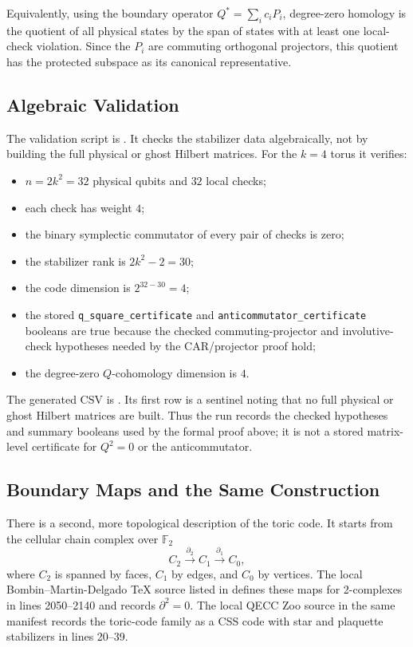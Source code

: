 Equivalently, using the boundary operator \(Q^*=\sum_i c_iP_i\), degree-zero
homology is the quotient of all physical states by the span of states with at
least one local-check violation. Since the \(P_i\) are commuting orthogonal
projectors, this quotient has the protected subspace as its canonical
representative.

\subsection{Algebraic Validation}

The validation script is
. It checks the
stabilizer data algebraically, not by building the full physical or ghost
Hilbert matrices. For the \(k=4\) torus it verifies:

\begin{itemize}
  \item \(n=2k^2=32\) physical qubits and \(32\) local checks;
  \item each check has weight \(4\);
  \item the binary symplectic commutator of every pair of checks is zero;
  \item the stabilizer rank is \(2k^2-2=30\);
  \item the code dimension is \(2^{32-30}=4\);
  \item the stored \texttt{q\_square\_certificate} and
  \texttt{anticommutator\_certificate} booleans are true because the checked
  commuting-projector and involutive-check hypotheses needed by the
  CAR/projector proof hold;
  \item the degree-zero \(Q\)-cohomology dimension is \(4\).
\end{itemize}

The generated CSV is
.
Its first row is a sentinel noting
that no full physical or ghost Hilbert matrices are built. Thus the run records
the checked hypotheses and summary booleans used by the formal proof above; it
is not a stored matrix-level certificate for \(Q^2=0\) or the anticommutator.

\subsection{Boundary Maps and the Same Construction}

There is a second, more topological description of the toric code. It starts
from the cellular chain complex over \(\mathbb{F}_2\)
\[
  C_2 \xrightarrow{\partial_2} C_1 \xrightarrow{\partial_1} C_0 ,
\]
where \(C_2\) is spanned by faces, \(C_1\) by edges, and \(C_0\) by vertices.
The local Bombin--Martin-Delgado TeX source listed in
 defines these maps for 2-complexes in
lines 2050--2140 and records \(\partial^2=0\). The local QECC Zoo source in the
same manifest records the toric-code family as a CSS code with star and
plaquette stabilizers in lines 20--39.

